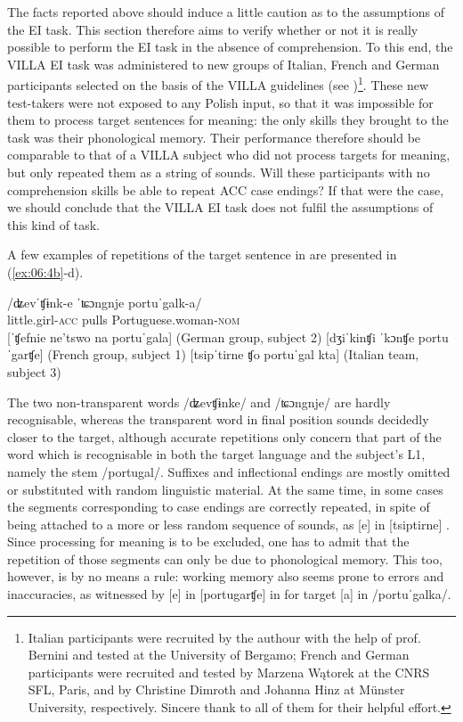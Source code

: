 The facts reported above should induce a little caution as to the assumptions of the EI task. This section therefore aims to verify whether or not it is really possible to perform the EI task in the absence of comprehension. To this end, the VILLA EI task was administered to new groups of Italian, French and German participants selected on the basis of the VILLA guidelines (see )\footnote{Italian participants were recruited by the authour with the help of prof. Bernini and tested at the University of Bergamo; French and German participants were recruited and tested by Marzena Wątorek at the CNRS SFL, Paris, and by Christine Dimroth and Johanna Hinz at Münster University, respectively. Sincere thank to all of them for their helpful effort.}. These new test-takers were not exposed to any Polish input, so that it was impossible for them to process target sentences for meaning: the only skills they brought to the task was their phonological memory. Their performance therefore should be comparable to that of a VILLA subject who did not process targets for meaning, but only repeated them as a string of sounds. Will these participants with no comprehension skills be able to repeat ACC case endings? If that were the case, we should conclude that the VILLA EI task does not fulfil the assumptions of this kind of task.

A few examples of repetitions of the target sentence in  are presented in (\ref{ex:06:4b}-d).

\ea%
    \label{ex:06:4}
    \ea\label{ex:06:4a}
    \gll    /ʥevˈʧɨnk-e  ˈʨɔngnje  portuˈgalk-a/ \\
            little.girl-\textsc{acc}   pulls     Portuguese.woman-\textsc{nom}\\
    \ex\label{ex:06:4b}
    [ˈʧefnie ne'tswo na portuˈgala] \hfill (German group, subject 2)
    \ex\label{ex:06:4c}
    [dʒiˈkinʧi ˈkɔnʧe portuˈgarʧe] \hfill (French group, subject 1)
    \ex\label{ex:06:4d}
    [tsipˈtirne ʧo portuˈgal kta] \hfill (Italian team, subject 3)
    \z
\z

The two non-transparent words /ʥevʧɨnke/ and /ʨɔngnje/ are hardly recognisable, whereas the transparent word in final position sounds decidedly closer to the target, although accurate repetitions only concern that part of the word which is recognisable in both the target language and the subject's L1, namely the stem /portugal/. Suffixes and inflectional endings are mostly omitted or substituted with random linguistic material. At the same time, in some cases the segments corresponding to case endings are correctly repeated, in spite of being attached to a more or less random sequence of sounds, as [e] in [tsiptirne] . Since processing for meaning is to be excluded, one has to admit that the repetition of those segments can only be due to phonological memory. This too, however, is by no means a rule: working memory also seems prone to errors and inaccuracies, as witnessed by [e] in [portugarʧe] in  for target [a] in /portuˈgalka/.

